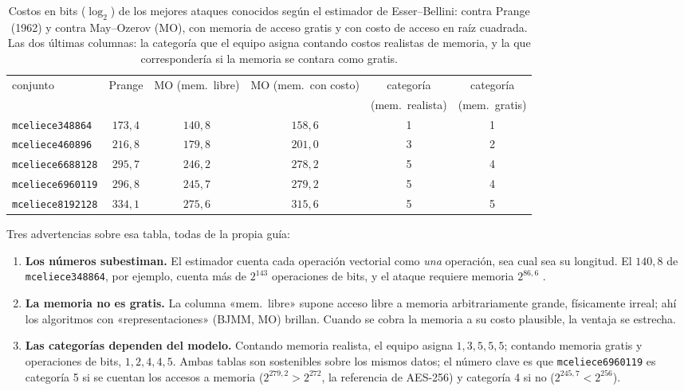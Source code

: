 \begin{table}[htbp]
\centering
\footnotesize
\setlength{\tabcolsep}{5pt}
\begin{tabular}{lccccc}
\toprule
conjunto & Prange & MO (mem.\ libre) & MO (mem.\ con costo) & categoría & categoría\\
 & & & & (mem.\ realista) & (mem.\ gratis)\\
\midrule
\texttt{mceliece348864} & $173{,}4$ & $140{,}8$ & $158{,}6$ & 1 & 1\\
\texttt{mceliece460896} & $216{,}8$ & $179{,}8$ & $201{,}0$ & 3 & 2\\
\texttt{mceliece6688128} & $295{,}7$ & $246{,}2$ & $278{,}2$ & 5 & 4\\
\texttt{mceliece6960119} & $296{,}8$ & $245{,}7$ & $279{,}2$ & 5 & 4\\
\texttt{mceliece8192128} & $334{,}1$ & $275{,}6$ & $315{,}6$ & 5 & 5\\
\bottomrule
\end{tabular}
\caption{Costos en bits ($\log_2$) de los mejores ataques conocidos
según el estimador de Esser--Bellini: contra Prange (1962) y contra
May--Ozerov (MO), con memoria de acceso gratis y con costo de acceso
en raíz cuadrada. Las dos últimas columnas: la categoría que el
equipo asigna contando costos realistas de memoria, y la que
correspondería si la memoria se contara como gratis.}
\label{tab:param-seguridad}
\end{table}

Tres advertencias sobre esa tabla, todas de la propia guía:

\begin{enumerate}[leftmargin=1.6em,itemsep=3pt]
  \item \textbf{Los números subestiman.} El estimador cuenta cada
        operación vectorial como \emph{una} operación, sea cual sea su
        longitud. El $140{,}8$ de \texttt{mceliece348864}, por ejemplo,
        cuenta más de $2^{143}$ operaciones de bits, y el ataque
        requiere memoria $2^{86{,}6}$ \cite{cmsecurity}.
  \item \textbf{La memoria no es gratis.} La columna «mem.\ libre»
        supone acceso libre a memoria arbitrariamente grande,
        físicamente irreal; ahí los algoritmos con
        «representaciones» (BJMM, MO) brillan. Cuando se cobra la
        memoria a su costo plausible, la ventaja se estrecha.
  \item \textbf{Las categorías dependen del modelo.} Contando
        memoria realista, el equipo asigna $1,3,5,5,5$; contando
        memoria gratis y operaciones de bits, $1,2,4,4,5$. Ambas
        tablas son sostenibles sobre los mismos datos; el número clave
        es que \texttt{mceliece6960119} es categoría 5 si se cuentan
        los accesos a memoria ($2^{279{,}2}>2^{272}$, la referencia de
        AES-256) y categoría 4 si no ($2^{245{,}7}<2^{256}$).
\end{enumerate}

